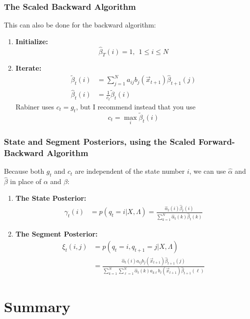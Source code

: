\documentclass{beamer}
\begin{document}
\begin{frame}
  \frametitle{The Scaled Backward Algorithm}

  This can also be done for the backward algorithm:
  \begin{enumerate}
  \item {\bf Initialize:}
    \[
    \hat\beta_T(i) = 1,~~1\le i\le N
    \]
  \item {\bf Iterate:}
    \begin{align*}
      \tilde\beta_{t}(i) &= \sum_{j=1}^N a_{ij}b_j(\vec{x}_{t+1})\hat\beta_{t+1}(j)\\
      \hat\beta_t(i) &= \frac{1}{c_t}\tilde\beta_t(i)
    \end{align*}
    Rabiner uses $c_t=g_t$, but I recommend instead that you use
    \begin{displaymath}
      c_t = \max_i\tilde\beta_t(i)
    \end{displaymath}
  \end{enumerate}
\end{frame}

\begin{frame}
  \frametitle{State and Segment Posteriors, using the Scaled Forward-Backward Algorithm}

  Because both $g_t$ and $c_t$ are independent of the state number
  $i$, we can use $\hat\alpha$ and $\hat\beta$ in place of $\alpha$
  and $\beta$:
  \begin{enumerate}
  \item {\bf The State Posterior:}
    \begin{align*}
      \gamma_t(i) & = p(q_t=i|X,\Lambda)
      = \frac{\hat\alpha_t(i)\hat\beta_t(i)}{\sum_{k=1}^N\hat\alpha_t(k)\hat\beta_t(k)}
    \end{align*}
  \item {\bf The Segment Posterior:}
    \begin{align*}
      \xi_t(i,j) & = p(q_t=i,q_{t+1}=j|X,\Lambda)\\
      &= \frac{\hat\alpha_t(i)a_{ij}b_j(\vec{x}_{t+1})\hat\beta_{t+1}(j)}{\sum_{k=1}^N\sum_{\ell=1}^N\hat\alpha_t(k)a_{k\ell}b_\ell(\vec{x}_{t+1})\hat\beta_{t+1}(\ell)}
    \end{align*}
  \end{enumerate}
\end{frame}


\section[Summary]{Summary}
\setcounter{subsection}{1}
\end{document}
